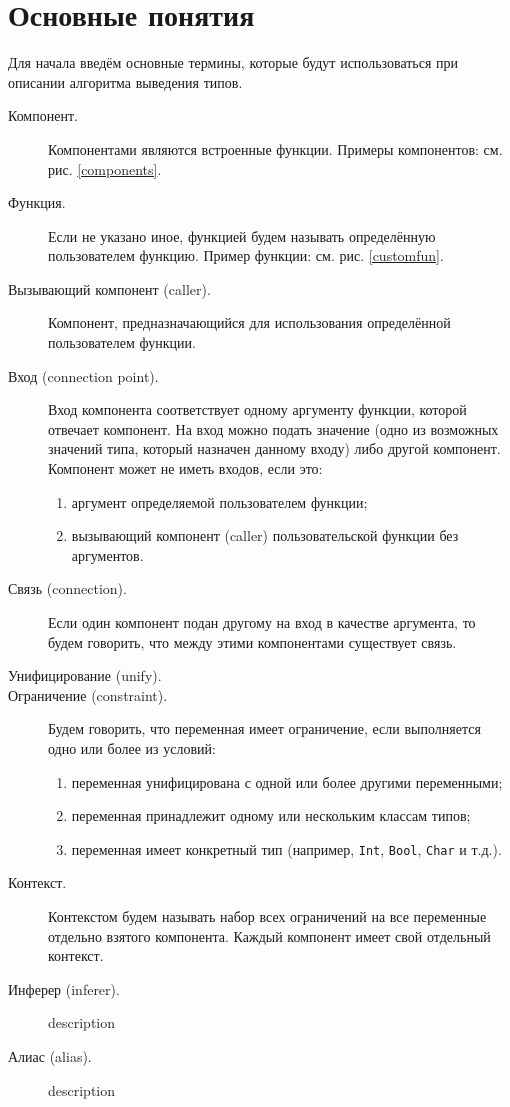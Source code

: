 \section{Основные понятия}
Для начала введём основные термины, которые будут использоваться при описании алгоритма выведения типов.
\begin{description}
	\item[Компонент.] Компонентами являются встроенные функции. Примеры компонентов: см. рис. \ref{components}.
	\item[Функция.] Если не указано иное, функцией будем называть определённую пользователем функцию. Пример функции: см. рис. \ref{customfun}.
	\item[Вызывающий компонент (caller).] Компонент, предназначающийся для использования определённой пользователем функции.
	\item[Вход (connection point).] Вход компонента соответствует одному аргументу функции, которой отвечает компонент. На вход можно подать значение (одно из возможных значений типа, который назначен данному входу) либо другой компонент. Компонент может не иметь входов, если это: 
	\begin{enumerate}[1)]
		\item аргумент определяемой пользователем функции;
		\item вызывающий компонент (caller) пользовательской функции без аргументов.
	\end{enumerate} 
	\item[Связь (connection).] Если один компонент подан другому на вход в качестве аргумента, то будем говорить, что между этими компонентами существует связь.
	\item[Унифицирование (unify).] 
	\item[Ограничение (constraint).] Будем говорить, что переменная имеет ограничение, если выполняется одно или более из условий:
		\begin{enumerate}[1)]
			\item переменная унифицирована с одной или более другими переменными;
			\item переменная принадлежит одному или нескольким классам типов;
			\item переменная имеет конкретный тип (например, \lstinline!Int!, \lstinline!Bool!, \lstinline!Char! и т.д.).
		\end{enumerate}  
	\item[Контекст.] Контекстом будем называть набор всех ограничений на все переменные отдельно взятого компонента. Каждый компонент имеет свой отдельный контекст.
	\item[Инферер (inferer).] description
	\item[Алиас (alias).] description
\end{description}

